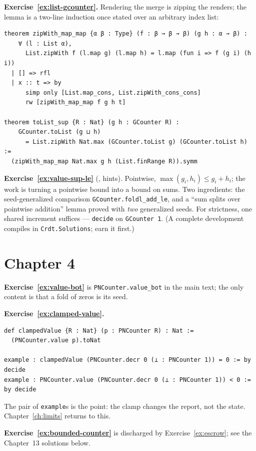 \documentclass[12pt, a4paper, openright]{book}
\theoremstyle{thmstyle}
\theoremstyle{defstyle}
\newcommand{\lc}[1]{\texttt{#1}}
\begin{document}
\textbf{Exercise~\ref{ex:list-gcounter}.} Rendering the merge is
zipping the renders; the lemma is a two-line induction once stated over
an arbitrary index list:

\begin{verbatim}
theorem zipWith_map_map {α β : Type} (f : β → β → β) (g h : α → β) :
    ∀ (l : List α),
      List.zipWith f (l.map g) (l.map h) = l.map (fun i => f (g i) (h i))
  | [] => rfl
  | x :: t => by
      simp only [List.map_cons, List.zipWith_cons_cons]
      rw [zipWith_map_map f g h t]

theorem toList_sup {R : Nat} (g h : GCounter R) :
    GCounter.toList (g ⊔ h)
      = List.zipWith Nat.max (GCounter.toList g) (GCounter.toList h) :=
  (zipWith_map_map Nat.max g h (List.finRange R)).symm
\end{verbatim}

\textbf{Exercise~\ref{ex:value-sup-le}} (,
hints). Pointwise, $\max(g_i, h_i) \le g_i + h_i$; the work is turning a
pointwise bound into a bound on sums. Two ingredients: the
seed-generalized comparison \lc{GCounter.foldl_add_le}, and a
``sum splits over pointwise addition'' lemma proved with \emph{two}
generalized seeds. For strictness, one shared increment suffices ---
\lc{decide} on \lc{GCounter 1}. (A complete development compiles in
\lc{Crdt.Solutions}; earn it first.)

\section*{Chapter 4}

\textbf{Exercise~\ref{ex:value-bot}} is \lc{PNCounter.value_bot} in the
main text; the only content is that a fold of zeros is its seed.

\textbf{Exercise~\ref{ex:clamped-value}.}

\begin{verbatim}
def clampedValue {R : Nat} (p : PNCounter R) : Nat :=
  (PNCounter.value p).toNat

example : clampedValue (PNCounter.decr 0 (⊥ : PNCounter 1)) = 0 := by decide
example : PNCounter.value (PNCounter.decr 0 (⊥ : PNCounter 1)) < 0 := by decide
\end{verbatim}

The pair of \lc{example}s is the point: the clamp changes the report,
not the state. Chapter~\ref{ch:limits} returns to this.

\textbf{Exercise~\ref{ex:bounded-counter}} is discharged by
Exercise~\ref{ex:escrow}; see the Chapter~13 solutions below.
\end{document}
